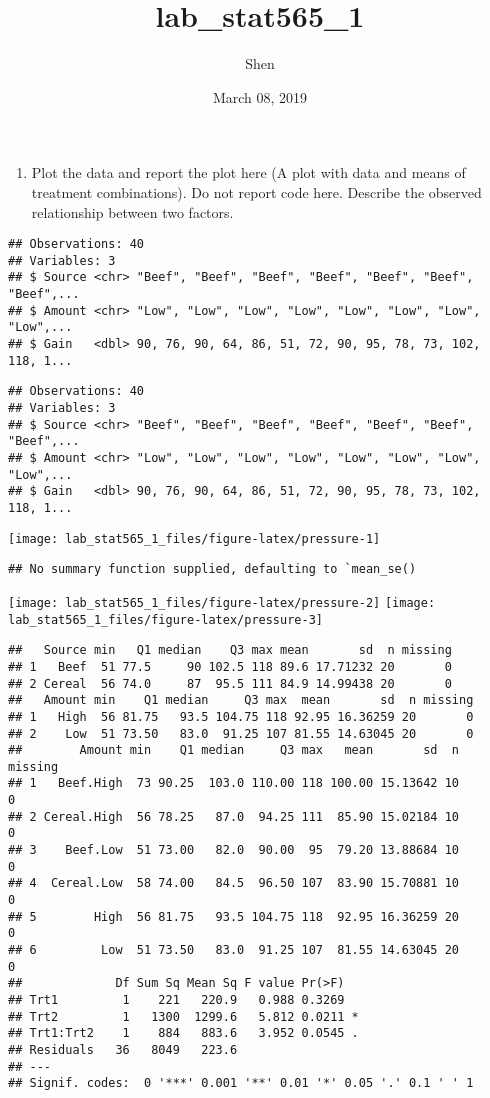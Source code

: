 \documentclass[]{article}
\title{lab\_stat565\_1}
\author{Shen}
\date{March 08, 2019}
\providecommand{\tightlist}{%
  \setlength{\itemsep}{0pt}\setlength{\parskip}{0pt}}
\begin{document}
\maketitle

\begin{enumerate}
\def\labelenumi{(\alph{enumi})}
\tightlist
\item
  Plot the data and report the plot here (A plot with data and means of
  treatment combinations). Do not report code here. Describe the
  observed relationship between two factors.
\end{enumerate}

\begin{verbatim}
## Observations: 40
## Variables: 3
## $ Source <chr> "Beef", "Beef", "Beef", "Beef", "Beef", "Beef", "Beef",...
## $ Amount <chr> "Low", "Low", "Low", "Low", "Low", "Low", "Low", "Low",...
## $ Gain   <dbl> 90, 76, 90, 64, 86, 51, 72, 90, 95, 78, 73, 102, 118, 1...
\end{verbatim}

\begin{verbatim}
## Observations: 40
## Variables: 3
## $ Source <chr> "Beef", "Beef", "Beef", "Beef", "Beef", "Beef", "Beef",...
## $ Amount <chr> "Low", "Low", "Low", "Low", "Low", "Low", "Low", "Low",...
## $ Gain   <dbl> 90, 76, 90, 64, 86, 51, 72, 90, 95, 78, 73, 102, 118, 1...
\end{verbatim}

\texttt{[image: lab\_stat565\_1\_files/figure-latex/pressure-1]}

\begin{verbatim}
## No summary function supplied, defaulting to `mean_se()
\end{verbatim}

\texttt{[image: lab\_stat565\_1\_files/figure-latex/pressure-2]}
\texttt{[image: lab\_stat565\_1\_files/figure-latex/pressure-3]}

\begin{verbatim}
##   Source min   Q1 median    Q3 max mean       sd  n missing
## 1   Beef  51 77.5     90 102.5 118 89.6 17.71232 20       0
## 2 Cereal  56 74.0     87  95.5 111 84.9 14.99438 20       0
##   Amount min    Q1 median     Q3 max  mean       sd  n missing
## 1   High  56 81.75   93.5 104.75 118 92.95 16.36259 20       0
## 2    Low  51 73.50   83.0  91.25 107 81.55 14.63045 20       0
##        Amount min    Q1 median     Q3 max   mean       sd  n missing
## 1   Beef.High  73 90.25  103.0 110.00 118 100.00 15.13642 10       0
## 2 Cereal.High  56 78.25   87.0  94.25 111  85.90 15.02184 10       0
## 3    Beef.Low  51 73.00   82.0  90.00  95  79.20 13.88684 10       0
## 4  Cereal.Low  58 74.00   84.5  96.50 107  83.90 15.70881 10       0
## 5        High  56 81.75   93.5 104.75 118  92.95 16.36259 20       0
## 6         Low  51 73.50   83.0  91.25 107  81.55 14.63045 20       0
##             Df Sum Sq Mean Sq F value Pr(>F)  
## Trt1         1    221   220.9   0.988 0.3269  
## Trt2         1   1300  1299.6   5.812 0.0211 *
## Trt1:Trt2    1    884   883.6   3.952 0.0545 .
## Residuals   36   8049   223.6                 
## ---
## Signif. codes:  0 '***' 0.001 '**' 0.01 '*' 0.05 '.' 0.1 ' ' 1
\end{verbatim}
\end{document}
